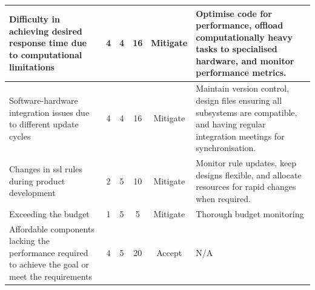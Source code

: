\begin{longtable}{|p{}|c|c|c|c|p{}|}
    Difficulty in achieving desired response time due to computational limitations                                          & 4 & 4 & 16 & Mitigate & Optimise code for performance, offload computationally heavy tasks to specialised hardware, and monitor performance metrics. \\ \hline
    Software-hardware integration issues due to different update cycles                                                     & 4 & 4 & 16 & Mitigate & Maintain version control, design files ensuring all subsystems are compatible, and having regular integration meetings for synchronisation. \\ \hline
    Changes in \ac{ssl} rules during product development                                                                    & 2 & 5 & 10 & Mitigate & Monitor rule updates, keep designs flexible, and allocate resources for rapid changes when required. \\ \hline
    Exceeding the budget                                                                                                    & 1 & 5 & 5  & Mitigate & Thorough budget monitoring \\ \hline
    Affordable components lacking the performance required to achieve the goal or meet the requirements                     & 4 & 5 & 20 & Accept   & N/A \\ \hline
\end{longtable}


